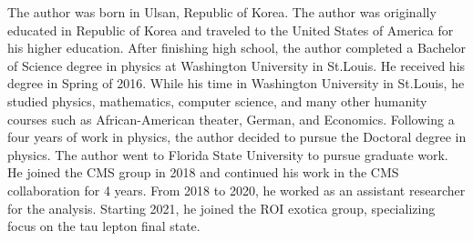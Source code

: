 \documentclass[11pt,expanded,copyright]{fsuthesis}
\begin{document}
\begin{biosketch}
The author was born in Ulsan, Republic of Korea. 
The author was originally educated in Republic of Korea and traveled to the United States of America for his higher education. 
After finishing high school, the author completed a Bachelor of Science degree in physics at Washington University in St.Louis.
He received his degree in Spring of 2016. 
While his time in Washington University in St.Louis, he studied physics, mathematics, computer science, and many other humanity courses such as African-American theater, German, and Economics.
Following a four years of work in physics, the author decided to pursue the Doctoral degree in physics.
The author went to Florida State University to pursue graduate work.
He joined the CMS group in 2018 and continued his work in the CMS collaboration for 4 years.
From 2018 to 2020, he worked as an assistant researcher for the \cite{ZHAN} analysis.
Starting 2021, he joined the ROI exotica group, specializing focus on the tau lepton final state.
\end{biosketch}

\end{document}

